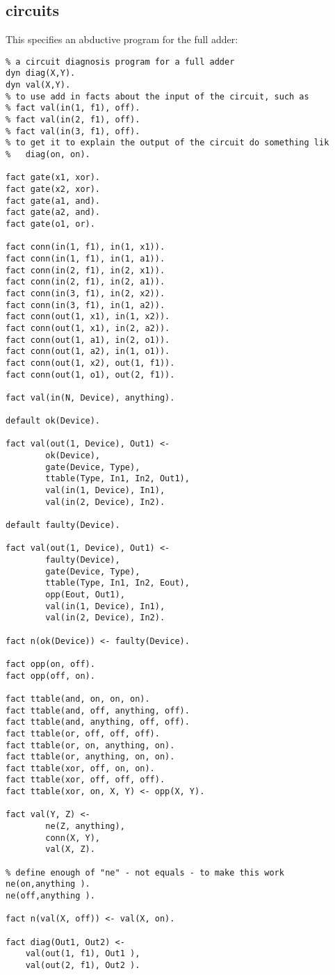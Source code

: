 \subsection{circuits}
This specifies an abductive program for the full adder:
\begin{verbatim}
% a circuit diagnosis program for a full adder
dyn diag(X,Y).
dyn val(X,Y).
% to use add in facts about the input of the circuit, such as
% fact val(in(1, f1), off).
% fact val(in(2, f1), off).
% fact val(in(3, f1), off).
% to get it to explain the output of the circuit do something lik
%	diag(on, on).

fact gate(x1, xor).
fact gate(x2, xor).
fact gate(a1, and).
fact gate(a2, and).
fact gate(o1, or).

fact conn(in(1, f1), in(1, x1)).
fact conn(in(1, f1), in(1, a1)).
fact conn(in(2, f1), in(2, x1)).
fact conn(in(2, f1), in(2, a1)).
fact conn(in(3, f1), in(2, x2)).
fact conn(in(3, f1), in(1, a2)).
fact conn(out(1, x1), in(1, x2)).
fact conn(out(1, x1), in(2, a2)).
fact conn(out(1, a1), in(2, o1)).
fact conn(out(1, a2), in(1, o1)).
fact conn(out(1, x2), out(1, f1)).
fact conn(out(1, o1), out(2, f1)).

fact val(in(N, Device), anything).

default ok(Device).

fact val(out(1, Device), Out1) <-
		ok(Device),
		gate(Device, Type),
		ttable(Type, In1, In2, Out1),
		val(in(1, Device), In1),
		val(in(2, Device), In2).

default faulty(Device).

fact val(out(1, Device), Out1) <-
		faulty(Device),
		gate(Device, Type),
		ttable(Type, In1, In2, Eout),
		opp(Eout, Out1),
		val(in(1, Device), In1),
		val(in(2, Device), In2).

fact n(ok(Device)) <- faulty(Device).

fact opp(on, off).
fact opp(off, on).

fact ttable(and, on, on, on).
fact ttable(and, off, anything, off).
fact ttable(and, anything, off, off).
fact ttable(or, off, off, off).
fact ttable(or, on, anything, on).
fact ttable(or, anything, on, on).
fact ttable(xor, off, on, on).
fact ttable(xor, off, off, off).
fact ttable(xor, on, X, Y) <- opp(X, Y).

fact val(Y, Z) <-
		ne(Z, anything),
		conn(X, Y),
		val(X, Z).

% define enough of "ne" - not equals - to make this work
ne(on,anything ).
ne(off,anything ).

fact n(val(X, off)) <- val(X, on).

fact diag(Out1, Out2) <-
	val(out(1, f1), Out1 ),
	val(out(2, f1), Out2 ).

\end{verbatim}
